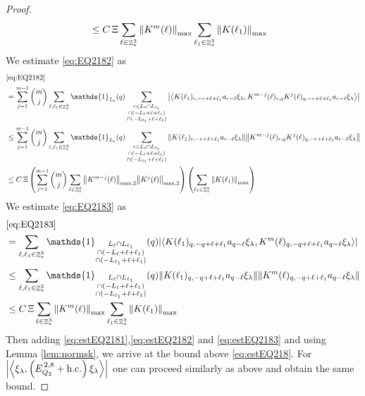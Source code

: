 \documentclass[12pt,a4paper]{article}
\numberwithin{equation}{section}
\newcommand{\1}{\mathbb{I}}
\DeclareMathOperator{\Z}{\mathbb{Z}}
\newcommand{\eva}[1]{\left\langle #1 \right\rangle}
\theoremstyle{plain}
\theoremstyle{definition}
\theoremstyle{remark}
\theoremstyle{plain}
\theoremstyle{definition}
\theoremstyle{remark}
\begin{document}
\begin{proof}
\begin{align}
	&\leq C\,\Xi \sum\limits_{\ell \in \Z^3_*} \norm{K^m(\ell)}_{\max} \sum\limits_{\ell_1 \in \Z^3_*} \norm{K(\ell_1)}_{\max}   \label{eq:estEQ2181}
\end{align}
We estimate \eqref{eq:EQ2182} as
\begin{align}
	& \eqref{eq:EQ2182}\nonumber\\
	&= \sum\limits_{j=1}^{m-1} {{m}\choose j} \sum\limits_{\ell, \ell_1\in \Z^3_*}\mathds{1}_{L_{\ell}}(q) \sum\limits_{\substack{r\in L_{\ell} \cap L_{\ell_1}\\\cap (-L_{\ell}+\ell+\ell_1) \\ \cap (-L_{\ell_1}+\ell+\ell_1)}}  \abs{\eva{ K(\ell_1)_{r,-r+\ell+\ell_1} a_{r-\ell} \xi_\lambda, K^{m-j}(\ell)_{r,q} K^j(\ell)_{q,-r+\ell+\ell_1} a_{r-\ell} \xi_\lambda }}\nonumber\\
	&\leq \sum\limits_{j=1}^{m-1} {{m}\choose j} \sum\limits_{\ell, \ell_1\in \Z^3_*}\mathds{1}_{L_{\ell}}(q) \sum\limits_{\substack{r\in L_{\ell} \cap L_{\ell_1}\\\cap (-L_{\ell}+\ell+\ell_1) \\ \cap (-L_{\ell_1}+\ell+\ell_1)}}  \norm{ K(\ell_1)_{r,-r+\ell+\ell_1} a_{r-\ell} \xi_\lambda} \norm{ K^{m-j}(\ell)_{r,q} K^j(\ell)_{q,-r+\ell+\ell_1} a_{r-\ell} \xi_\lambda} \nonumber\\
	&\leq C\,\Xi \left(\sum\limits_{j=1}^{m-1} {{m}\choose j} \sum\limits_{ \ell\in \Z^3_*} \norm{K^{m-j}(\ell)}_{\mathrm{max,2}} \norm{K^j(\ell)}_{\mathrm{max,2}}\right) \left(\sum\limits_{ \ell_1\in \Z^3_*}\norm{ K(\ell_1)}_{\max} \right) \label{eq:estEQ2182}
\end{align}
We estimate \eqref{eq:EQ2183} as
\begin{align}
	& \eqref{eq:EQ2183}\nonumber\\
	&= \sum\limits_{\ell, \ell_1\in \Z^3_*} \mathds{1}_{\substack{L_{\ell}\cap L_{\ell_1}\\\cap (-L_{\ell}+\ell+\ell_1) \\ \cap (-L_{\ell_1}+\ell+\ell_1)}} (q) \abs{\eva{K(\ell_1)_{q,-q+\ell+\ell_1} a_{q-\ell} \xi_\lambda, K^m(\ell)_{q,-q+\ell+\ell_1} a_{q-\ell}\xi_\lambda }}\nonumber\\
	&\leq \sum\limits_{\ell, \ell_1\in \Z^3_*} \mathds{1}_{\substack{L_{\ell}\cap L_{\ell_1}\\\cap (-L_{\ell}+\ell+\ell_1) \\ \cap (-L_{\ell_1}+\ell+\ell_1)}} (q) \norm{K(\ell_1)_{q,-q+\ell+\ell_1} a_{q-\ell} \xi_\lambda}\norm{ K^m(\ell)_{q,-q+\ell+\ell_1} a_{q-\ell}\xi_\lambda }\nonumber\\
	&\leq C\,\Xi \sum\limits_{\ell \in \Z^3_*} \norm{K^m(\ell)}_{\max} \sum\limits_{\ell_1 \in \Z^3_*} \norm{K(\ell_1)}_{\max}  \label{eq:estEQ2183}
\end{align} 
Then adding \eqref{eq:estEQ2181},\eqref{eq:estEQ2182} and \eqref{eq:estEQ2183} and using Lemma \ref{lem:normsk}, we arrive at the bound above \eqref{eq:estEQ218}. For $\abs{\eva{\xi_\lambda,\left(E^{\,2,8}_{Q_2}+\mathrm{h.c.}\right) \xi_\lambda }}$ one can proceed similarly as above and obtain the same bound.
\end{proof}
\end{document}
